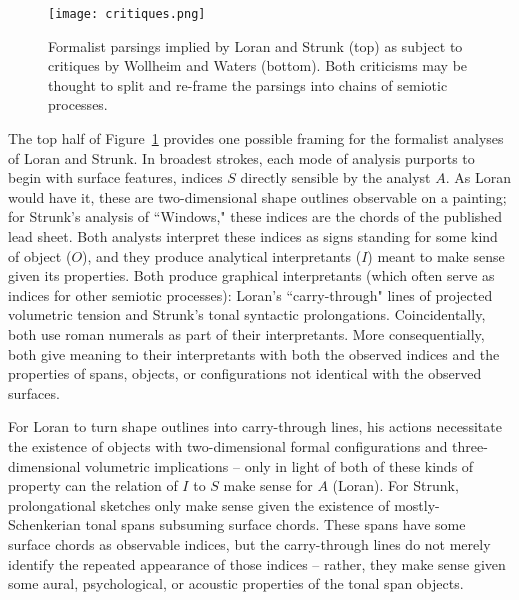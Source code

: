 \begin{figure}
	\centering
	\caption{Formalist parsings implied by Loran and Strunk (top) as subject to critiques by Wollheim and Waters (bottom).  Both criticisms may be thought to split and re-frame the parsings into chains of semiotic processes.}
	\label{critiques}
	\texttt{[image: critiques.png]}
\end{figure}

The top half of Figure~\ref{critiques} provides one possible framing for the formalist analyses of Loran and Strunk.  In broadest strokes, each mode of analysis purports to begin with surface features, indices $S$ directly sensible by the analyst $A$.  As Loran would have it, these are two-dimensional shape outlines observable on a painting; for Strunk's analysis of ``Windows," these indices are the chords of the published lead sheet.  Both analysts interpret these indices as signs standing for some kind of object ($O$), and they produce analytical interpretants ($I$) meant to make sense given its properties.  Both produce graphical interpretants (which often serve as indices for other semiotic processes): Loran's ``carry-through" lines of projected volumetric tension and Strunk's tonal syntactic prolongations.  Coincidentally, both use roman numerals as part of their interpretants.  More consequentially, both give meaning to their interpretants with both the observed indices and the properties of spans, objects, or configurations not identical with the observed surfaces.

For Loran to turn shape outlines into carry-through lines, his actions necessitate the existence of objects with two-dimensional formal configurations and three-dimensional volumetric implications -- only in light of both of these kinds of property can the relation of $I$ to $S$ make sense for $A$ (Loran).  For Strunk, prolongational sketches only make sense given the existence of mostly-Schenkerian tonal spans subsuming surface chords.  These spans have some surface chords as observable indices, but the carry-through lines do not merely identify the repeated appearance of those indices -- rather, they make sense given some aural, psychological, or acoustic properties of the tonal span objects.

